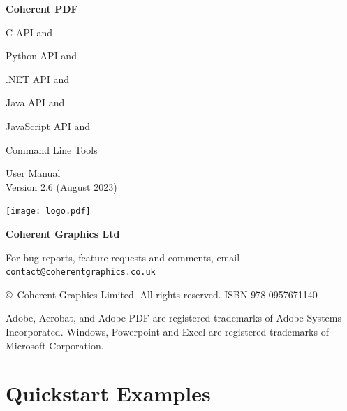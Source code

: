 \documentclass{book}
\newcommand{\smallgap}{\bigskip}
\begin{document}
\frontmatter
\pagestyle{empty}


\begin{flushright}


{\sffamily \bfseries \Huge Coherent PDF

\vspace{2mm}
\begin{cpdflib}
C API and 
\end{cpdflib}
\begin{pycpdflib}
Python API and
\end{pycpdflib}
\begin{dotnetcpdflib}
.NET API and
\end{dotnetcpdflib}
\begin{jcpdflib}
Java API and
\end{jcpdflib}
\begin{jscpdflib}
JavaScript API and
\end{jscpdflib}
Command Line Tools}

\vspace{12mm}

{\Huge User Manual}\\
Version 2.6 (August 2023)

\vspace{25mm}

\vfill
\ifdefined\HCode
\else
\texttt{[image: logo.pdf]}
\fi


\vspace{2mm}
{\sffamily \bfseries \LARGE Coherent Graphics Ltd}

\end{flushright}

\clearpage

\pagestyle{empty}
\noindent For bug reports, feature requests and comments, email\\ \texttt{contact@coherentgraphics.co.uk}

\vspace*{\fill}
\noindent\copyright\ Coherent Graphics Limited. All rights reserved. ISBN 978-0957671140

\smallgap 
\noindent Adobe, Acrobat, and Adobe PDF are
registered trademarks of Adobe Systems Incorporated. Windows, Powerpoint and
Excel are registered trademarks of Microsoft Corporation.

\cleardoublepage

\pagestyle{plain}
\chapter*{Quickstart Examples}
\end{document}
